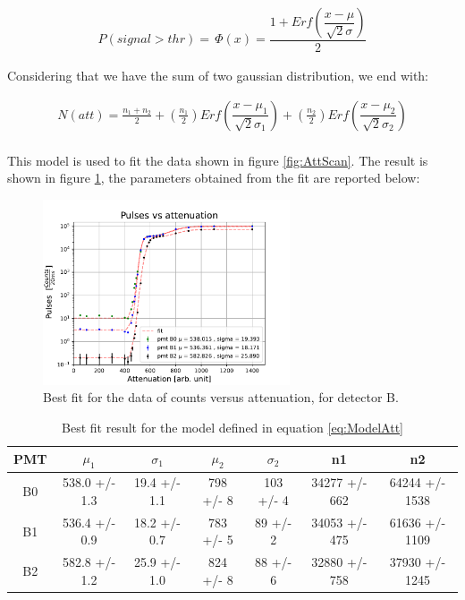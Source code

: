 \begin{align*}
P(signal > thr) = \, \Phi(x) = \dfrac{1 + Erf(\dfrac{x - \mu}{\sqrt{2} \sigma })}{2}
\end{align*}

Considering that we have the sum of two gaussian distribution, we end with:

\begin{equation} \label{eq:ModelAtt}
\begin{split}
N(att) = \frac{n_{1} + n_{2}}{2} + (\frac{n_{1}}{2}) Erf(\dfrac{x - \mu_{1}}{\sqrt{2} \sigma_{1} })   + (\frac{n_{2}}{2}) Erf(\dfrac{x - \mu_{2}}{\sqrt{2} \sigma_{2}}) \\
\end{split}
\end{equation}

This model is used to fit the data shown in figure \ref{fig:AttScan}. The result is shown in figure \ref{fig:BestFitAtt}, the parameters obtained from the fit are reported below:

\begin{figure}[!ht]
\centering
\includegraphics[width = 0.65\textwidth ]{Analysis/CalibrationPMT/Fit_attenuation.pdf}
\caption{Best fit for the data of counts versus attenuation, for detector B.}
\label{fig:BestFitAtt}
\end{figure}

\begin{table}[!ht]
\centering
\begin{tabular}{c|c|c|c|c|c|c}
\hline
 PMT   &  $\mu_{1}$         &  $\sigma_{1}$         & $\mu_{2}$          & $\sigma_{2}$   & n1                & n2                 \\
\hline
 B0    & 538.0 +/- 1.3 & 19.4 +/- 1.1 & 798 +/- 8 & 103 +/- 4 & 34277 +/- 662 & 64244 +/- 1538 \\
 B1    & 536.4 +/- 0.9 & 18.2 +/- 0.7 & 783 +/- 5 & 89 +/- 2  & 34053 +/- 475 & 61636 +/- 1109 \\
 B2    & 582.8 +/- 1.2 & 25.9 +/- 1.0 & 824 +/- 8 & 88 +/- 6  & 32880 +/- 758 & 37930 +/- 1245 \\
\hline
\end{tabular}
\caption{Best fit result for the model defined in equation \ref{eq:ModelAtt}}
\end{table}


